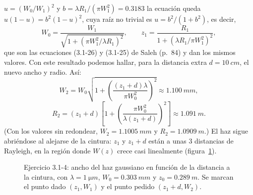 \documentclass{article}
\begin{document}
$u=(W_0/W_1)^2$ y $b=\lambda R_1/(\pi W_1^2)=0.3183$ la ecuación queda $u(1-u)=b^2(1-u)^2$, cuya raíz no
trivial es $u=b^2/(1+b^2)$, es decir,
\[
W_0=\frac{W_1}{\sqrt{1+\left(\pi W_1^2/\lambda R_1\right)^2}},\qquad
z_1=\frac{R_1}{1+\left(\lambda R_1/\pi W_1^2\right)^2},
\]
que son las ecuaciones (3.1-26) y (3.1-25) de Saleh (p.~84) y dan los mismos valores.
Con este resultado podemos hallar, para la distancia extra $d=\SI{10}{cm}$, el nuevo ancho y radio. Así:
\[
W_2=W_0\sqrt{1+\left(\frac{(z_1+d)\lambda}{\pi W_0^2}\right)^2}\approx\boxed{\SI{1.100}{mm}},
\]
\[
R_2=(z_1+d)\left[1+\left(\frac{\pi W_0^2}{\lambda(z_1+d)}\right)^2\right]\approx\boxed{\SI{1.091}{m}}.
\]
(Con los valores sin redondear, $W_2=\SI{1.1005}{mm}$ y $R_2=\SI{1.0909}{m}$.) El haz sigue abriéndose
al alejarse de la cintura: $z_1$ y $z_1+d$ están a unas 3 distancias de Rayleigh, en la región donde
$W(z)$ crece casi linealmente (figura~\ref{fig:haz}).

\begin{figure}[H]
\centering
{}
\caption{Ejercicio 3.1-4: ancho del haz gaussiano en función de la distancia a la cintura, con
$\lambda=\SI{1}{\micro m}$, $W_0=\SI{0.303}{mm}$ y $z_0=\SI{0.289}{m}$. Se marcan el punto dado
$(z_1,W_1)$ y el punto pedido $(z_1+d,W_2)$.}
\label{fig:haz}
\end{figure}
\end{document}
